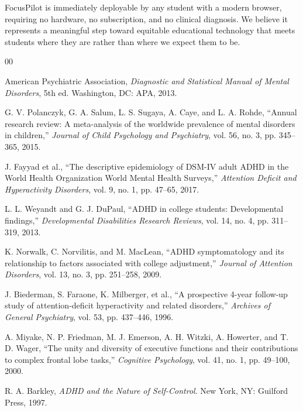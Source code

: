 \documentclass[conference]{IEEEtran}
\begin{document}
FocusPilot is immediately deployable by any student with a modern browser, requiring no hardware, no subscription, and no clinical diagnosis. We believe it represents a meaningful step toward equitable educational technology that meets students where they are rather than where we expect them to be.

\begin{thebibliography}{00}

American Psychiatric Association, \textit{Diagnostic and Statistical Manual of Mental Disorders}, 5th ed. Washington, DC: APA, 2013.

G. V. Polanczyk, G. A. Salum, L. S. Sugaya, A. Caye, and L. A. Rohde, ``Annual research review: A meta-analysis of the worldwide prevalence of mental disorders in children,'' \textit{Journal of Child Psychology and Psychiatry}, vol. 56, no. 3, pp. 345--365, 2015.

J. Fayyad et al., ``The descriptive epidemiology of DSM-IV adult ADHD in the World Health Organization World Mental Health Surveys,'' \textit{Attention Deficit and Hyperactivity Disorders}, vol. 9, no. 1, pp. 47--65, 2017.

L. L. Weyandt and G. J. DuPaul, ``ADHD in college students: Developmental findings,'' \textit{Developmental Disabilities Research Reviews}, vol. 14, no. 4, pp. 311--319, 2013.

K. Norwalk, C. Norvilitis, and M. MacLean, ``ADHD symptomatology and its relationship to factors associated with college adjustment,'' \textit{Journal of Attention Disorders}, vol. 13, no. 3, pp. 251--258, 2009.

J. Biederman, S. Faraone, K. Milberger, et al., ``A prospective 4-year follow-up study of attention-deficit hyperactivity and related disorders,'' \textit{Archives of General Psychiatry}, vol. 53, pp. 437--446, 1996.

A. Miyake, N. P. Friedman, M. J. Emerson, A. H. Witzki, A. Howerter, and T. D. Wager, ``The unity and diversity of executive functions and their contributions to complex frontal lobe tasks,'' \textit{Cognitive Psychology}, vol. 41, no. 1, pp. 49--100, 2000.

R. A. Barkley, \textit{ADHD and the Nature of Self-Control}. New York, NY: Guilford Press, 1997.


\end{thebibliography}
\end{document}
